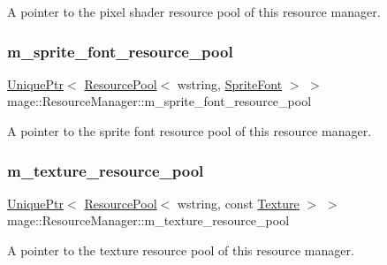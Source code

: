 A pointer to the pixel shader resource pool of this resource manager. \hypertarget{classmage_1_1_resource_manager_a49369b160a75dee96cdebd2b957ae0c4}{}\label{classmage_1_1_resource_manager_a49369b160a75dee96cdebd2b957ae0c4} 
\subsubsection{\texorpdfstring{m\+\_\+sprite\+\_\+font\+\_\+resource\+\_\+pool}{m\_sprite\_font\_resource\_pool}}
{\footnotesize\ttfamily \hyperlink{namespacemage_a3316d7143a973e37adf1110f2e80ca31}{Unique\+Ptr}$<$ \hyperlink{classmage_1_1_resource_pool}{Resource\+Pool}$<$ wstring, \hyperlink{classmage_1_1_sprite_font}{Sprite\+Font} $>$ $>$ mage\+::\+Resource\+Manager\+::m\+\_\+sprite\+\_\+font\+\_\+resource\+\_\+pool\hspace{0.3cm}{\ttfamily [private]}}

A pointer to the sprite font resource pool of this resource manager. \hypertarget{classmage_1_1_resource_manager_a267774ad90f546e73a9415e6baa37d2a}{}\label{classmage_1_1_resource_manager_a267774ad90f546e73a9415e6baa37d2a} 
\subsubsection{\texorpdfstring{m\+\_\+texture\+\_\+resource\+\_\+pool}{m\_texture\_resource\_pool}}
{\footnotesize\ttfamily \hyperlink{namespacemage_a3316d7143a973e37adf1110f2e80ca31}{Unique\+Ptr}$<$ \hyperlink{classmage_1_1_resource_pool}{Resource\+Pool}$<$ wstring, const \hyperlink{classmage_1_1_texture}{Texture} $>$ $>$ mage\+::\+Resource\+Manager\+::m\+\_\+texture\+\_\+resource\+\_\+pool\hspace{0.3cm}{\ttfamily [private]}}

A pointer to the texture resource pool of this resource manager. \hypertarget{classmage_1_1_resource_manager_adc36ebb3e2d04fddc3a23e2f1303dbfe}{}\label{classmage_1_1_resource_manager_adc36ebb3e2d04fddc3a23e2f1303dbfe} 
